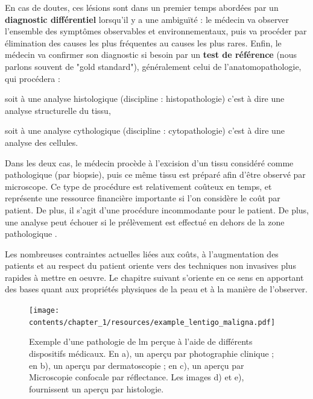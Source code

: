 En cas de doutes, ces lésions sont dans un premier temps abordées par un \textbf{diagnostic différentiel} lorsqu'il y a une ambiguïté : le médecin va observer l'ensemble des symptômes observables et environnementaux, puis va procéder par élimination des causes les plus fréquentes au causes les plus rares. Enfin, le médecin va confirmer son diagnostic si besoin par un \textbf{test de référence} (nous parlons souvent de "gold standard"), généralement celui de l'anatomopathologie, qui procédera :
\begin{inlinerate}
\item soit à une analyse histologique (discipline : histopathologie) c'est à dire une analyse structurelle du tissu,
\item soit à une analyse cythologique (discipline : cytopathologie) c'est à dire une analyse des cellules.
\end{inlinerate}
Dans les deux cas, le médecin procède à l'excision d'un tissu considéré comme pathologique (par biopsie), puis ce même tissu est préparé afin d'être observé par microscope. Ce type de procédure est relativement coûteux en temps, et représente une ressource financière importante si l'on considère le coût par patient. De plus, il s'agit d'une procédure incommodante pour le patient. De plus, une analyse peut échouer si le prélèvement est effectué en dehors de la zone pathologique \cite{LeGal2011}.\par

Les nombreuses contraintes actuelles liées aux coûts, à l'augmentation des patients et au respect du patient oriente vers des techniques non invasives plus rapides à mettre en oeuvre. Le chapitre suivant s'oriente en ce sens en apportant des bases quant aux propriétés physiques de la peau et à la manière de l'observer.\par

\begin{figure}[H]
    \centering
    \texttt{[image: contents/chapter\_1/resources/example\_lentigo\_maligna.pdf]}
    \caption{Exemple d'une pathologie de \gls{lm} perçue à l'aide de différents dispositifs médicaux. En a), un aperçu par photographie clinique ; en b), un aperçu par dermatoscopie ; en c), un aperçu par Microscopie confocale par réflectance. Les images d) et e), fournissent un aperçu par histologie.}
    \label{fig:example_lentigo_maligna}
\end{figure}\par